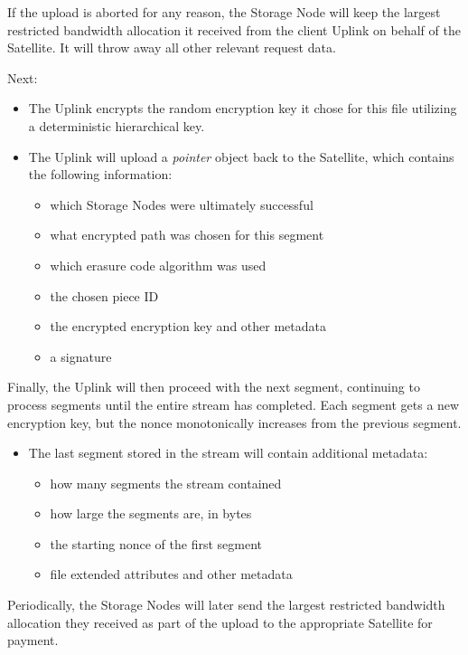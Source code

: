 \documentclass[8pt,fleqn,openany]{book}
\begin{document}
If the upload is aborted for any reason, the Storage Node will keep the
largest restricted bandwidth allocation it received from the client Uplink on
behalf of the Satellite. It will throw away all other relevant request data.

Next:

\begin{itemize}
\item The Uplink encrypts the random encryption key it chose for this file
  utilizing a deterministic hierarchical key.
\item The Uplink will upload a {\em pointer} object back to the Satellite, which
  contains the following information:
  \begin{itemize}
  \item which Storage Nodes were ultimately successful
  \item what encrypted path was chosen for this segment
  \item which erasure code algorithm was used
  \item the chosen piece ID
  \item the encrypted encryption key and other metadata
  \item a signature
  \end{itemize}
\end{itemize}

Finally, the Uplink will then proceed with the next segment, continuing to
process segments until the entire stream has completed. Each segment gets
a new encryption key, but the nonce monotonically increases from the previous
segment.

\begin{itemize}
\item The last segment stored in the stream will contain additional metadata:
  \begin{itemize}
  \item how many segments the stream contained
  \item how large the segments are, in bytes
  \item the starting nonce of the first segment
  \item file extended attributes and other metadata
  \end{itemize}
\end{itemize}

Periodically, the Storage Nodes will later send the largest restricted
bandwidth allocation they received as part of the upload to the appropriate
Satellite for payment.
\end{document}
